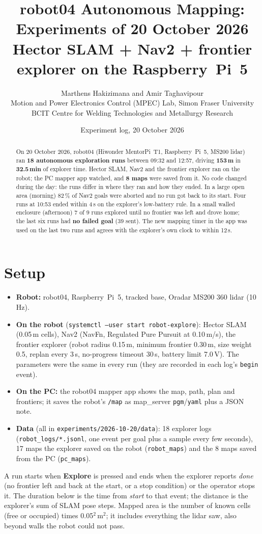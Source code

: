 \documentclass[10pt]{article}
\title{\textbf{robot04 Autonomous Mapping: Experiments of 20 October 2026}\\[2pt]
\large Hector SLAM + Nav2 + frontier explorer on the Raspberry~Pi~5}
\author{Marthens Hakizimana and Amir Taghavipour\\
\small Motion and Power Electronics Control (MPEC) Lab, Simon Fraser University\\
\small BCIT Centre for Welding Technologies and Metallurgy Research}
\date{\small Experiment log, 20 October 2026}
\begin{document}
\maketitle

\begin{abstract}
\noindent
On 20 October 2026, robot04 (Hiwonder MentorPi~T1, Raspberry~Pi~5, MS200 lidar) ran
\textbf{18 autonomous exploration runs} between 09:32 and 12:57, driving \textbf{153\,m} in
\textbf{32.5\,min} of explorer time. Hector SLAM, Nav2 and the frontier explorer ran on the robot;
the PC mapper app watched, and \textbf{8 maps} were saved from it. No code changed during the day: the runs
differ in where they ran and how they ended. In a large open area (morning) 82\,\% of Nav2 goals
were aborted and no run got back to its start. Four runs at 10:53 ended within 4\,s on the explorer's
low-battery rule. In a small walled enclosure (afternoon) 7 of 9 runs explored until no frontier was left
and drove home; the last six runs had \textbf{no failed goal} (39 sent). The new mapping timer in the app was
used on the last two runs and agrees with the explorer's own clock to within 12\,s.
\end{abstract}

\section{Setup}
\begin{itemize}
\item \textbf{Robot:} robot04, Raspberry~Pi~5, tracked base, Oradar MS200 360\textdegree{} lidar (10\,Hz).
\item \textbf{On the robot} (\texttt{systemctl --user start robot-explore}): Hector SLAM (0.05\,m cells),
Nav2 (NavFn, Regulated Pure Pursuit at 0.10\,m/s), the frontier explorer
(robot radius 0.15\,m, minimum frontier 0.30\,m, size weight 0.5, replan every 3\,s,
no-progress timeout 30\,s, battery limit 7.0\,V). The parameters were the same in every run
(they are recorded in each log's \texttt{begin} event).
\item \textbf{On the PC:} the robot04 mapper app shows the map, path, plan and frontiers; it saves the
robot's \texttt{/map} as map\_server \texttt{pgm}/\texttt{yaml} plus a JSON note.
\item \textbf{Data} (all in \texttt{experiments/2026-10-20/data}): 18 explorer logs
(\texttt{robot\_logs/*.jsonl}, one event per goal plus a sample every few seconds), 17 maps the
explorer saved on the robot (\texttt{robot\_maps}) and the 8 maps saved from the PC (\texttt{pc\_maps}).
\end{itemize}
A run starts when \textbf{Explore} is pressed and ends when the explorer reports \emph{done} (no frontier left
and back at the start, or a stop condition) or the operator stops it. The duration below is the time
from \emph{start} to that event; the distance is the explorer's sum of SLAM pose steps.
Mapped area is the number of known cells (free or occupied) times 0.05$^2$\,m$^2$; it includes
everything the lidar saw, also beyond walls the robot could not pass.
\end{document}
